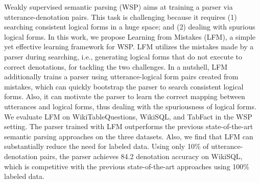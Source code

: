Weakly supervised semantic parsing (WSP) aims at training a parser via utterance-denotation pairs. This task is challenging because it requires (1) searching consistent logical forms in a huge space; and (2) dealing with spurious logical forms. In this work, we propose Learning from Mistakes (LFM), a simple yet effective learning framework for WSP. LFM utilizes the mistakes made by a parser during searching, i.e., generating logical forms that do not execute to correct denotations, for tackling the two challenges. In a nutshell, LFM additionally trains a parser using utterance-logical form pairs created from mistakes, which can quickly bootstrap the parser to search consistent logical forms. Also, it can motivate the parser to learn the correct mapping between utterances and logical forms, thus dealing with the spuriousness of logical forms. We evaluate LFM on WikiTableQuestions, WikiSQL, and TabFact in the WSP setting. The parser trained with LFM outperforms the previous state-of-the-art semantic parsing approaches on the three datasets. Also, we find that LFM can substantially reduce the need for labeled data. Using only 10\% of utterance-denotation pairs, the parser achieves 84.2 denotation accuracy on WikiSQL, which is competitive with the previous state-of-the-art approaches using 100\% labeled data.
